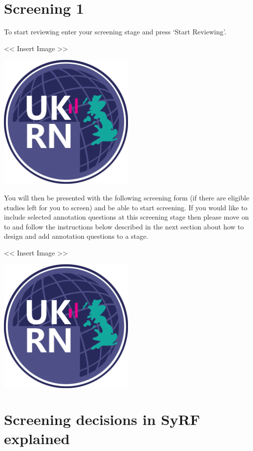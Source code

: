 \documentclass[]{book}
\begin{document}
\section{Screening 1}\label{screening-1}

To start reviewing enter your screening stage and press `Start
Reviewing'.

\textless{}\textless{} Insert Image \textgreater{}\textgreater{}

\includegraphics[width=0.50000\textwidth,height=0.50000\textwidth]{figs/evidence-triangle.png}

You will then be presented with the following screening form (if there
are eligible studies left for you to screen) and be able to start
screening. If you would like to include selected annotation questions at
this screening stage then please move on to and follow the instructions
below described in the next section about how to design and add
annotation questions to a stage.

\textless{}\textless{} Insert Image \textgreater{}\textgreater{}

\includegraphics[width=0.50000\textwidth,height=0.50000\textwidth]{figs/evidence-triangle.png}

\section{Screening decisions in SyRF
explained}\label{screening-decisions-in-syrf-explained}
\end{document}
